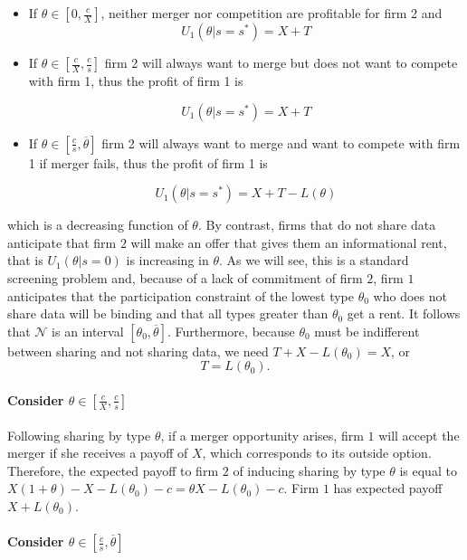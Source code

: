 \documentclass[a4paper]{article}
\newcommand{\N}{\mathcal N}
\renewcommand{\t}{\theta}
\begin{document}
\begin{itemize}
    \item If $\t\in[0,\frac{c}{X}]$, neither merger nor competition are profitable for firm 2 and
    \[U_1(\t|s=s^*)=X+T\]
    \item If $\t\in[\frac{c}{X},\frac{c}{s}]$ firm 2 will always want to merge but does not want to compete with firm 1, thus the profit of firm 1 is
    
    \[U_1(\t|s=s^*)=X+T\]
    \item If $\t\in[\frac{c}{s},\overline \t]$ firm 2 will always want to merge and want to compete with firm 1 if merger fails, thus the profit of firm 1 is
    
    \[U_1(\t|s=s^*)=X+T-L(\t)\]
\end{itemize}

%

which is a decreasing function of $\t$. By contrast, firms that do not share data anticipate that firm $2$ will make an offer that gives them an informational rent, that is $U_1(\t|s=0)$ is increasing in $\t$. As we will see, this is a standard screening problem and, because of a lack of commitment of firm $2$, firm $1$ anticipates that the participation constraint of the lowest type $\t_0$ who does not share data will be binding and that all types greater than $\t_0$ get a rent. It follows that $\N$ is an interval $[\theta_0,\overline \t]$. Furthermore, because $\t_0$ must be indifferent between sharing and not sharing data, we need $T+X-L(\t_0)=X$, or
\begin{equation}\label{eq:T}
  T=L(\t_0).
\end{equation}
%

\paragraph{Consider $\t\in[\frac{c}{X},\frac{c}{s}]$}


Following sharing by type $\t$, if a merger opportunity arises, firm $1$ will accept the merger if she receives a payoff of $X$, which corresponds to its outside option. Therefore, the expected payoff to firm $2$ of inducing sharing by type $\t$ is equal to $X(1+\t)-X-L(\t_0)-c=\t X-L(\t_0)-c$. Firm $1$ has expected payoff $X+L(\t_0)$.


\paragraph{Consider $\t\in[\frac{c}{s},\overline \t]$}
\end{document}
